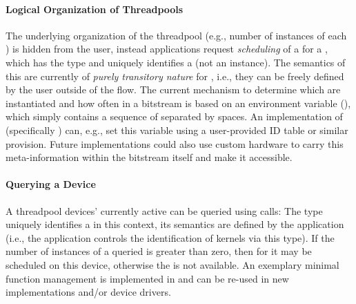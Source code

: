 \paragraph{Logical Organization of Threadpools}
The underlying organization of the threadpool (e.g., number of instances of each ) is hidden from the  user, instead applications request \emph{scheduling} of a  for a , which has the type  and uniquely identifies a  (not an instance).
The semantics of this  are currently of \emph{purely transitory nature} for \tpc{}, i.e., they can be freely defined by the user outside of the flow.
The current mechanism to determine which  are instantiated and how often in a bitstream is based on an environment variable (), which simply contains a sequence of  separated by spaces.
An implementation of  (specifically ) can, e.g.,  set this variable using a user-provided ID table or similar provision.
Future  implementations could also use custom hardware to carry this meta-information within the bitstream itself and make it accessible.

\paragraph{Querying a Device}
A threadpool devices' currently active  can be queried using  calls:
The type  uniquely identifies a  in this context, its semantics are defined by the application (i.e., the application controls the identification of kernels via this type).
If the number of instances of a queried  is greater than zero, then  for it may be scheduled on this device, otherwise the  is not available.
An exemplary minimal function management is implemented in  and can be re-used in new implementations and/or device drivers.

